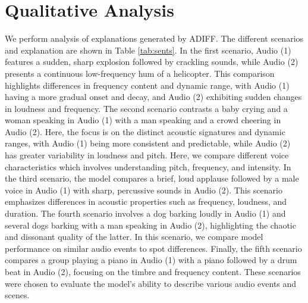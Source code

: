 \section{Qualitative Analysis} \vspace{-0.1in}
We perform analysis of explanations generated by ADIFF. The different scenarios and explanation are shown in Table \ref{tab:sents}. In the first scenario, Audio (1) features a sudden, sharp explosion followed by crackling sounds, while Audio (2) presents a continuous low-frequency hum of a helicopter. This comparison highlights differences in frequency content and dynamic range, with Audio (1) having a more gradual onset and decay, and Audio (2) exhibiting sudden changes in loudness and frequency. The second scenario contrasts a baby crying and a woman speaking in Audio (1) with a man speaking and a crowd cheering in Audio (2). Here, the focus is on the distinct acoustic signatures and dynamic ranges, with Audio (1) being more consistent and predictable, while Audio (2) has greater variability in loudness and pitch. Here, we compare different voice characteristics which involves understanding pitch, frequency, and intensity. In the third scenario, the model compares a brief, loud applause followed by a male voice in Audio (1) with sharp, percussive sounds in Audio (2). This scenario emphasizes differences in acoustic properties such as frequency, loudness, and duration. The fourth scenario involves a dog barking loudly in Audio (1) and several dogs barking with a man speaking in Audio (2), highlighting the chaotic and dissonant quality of the latter. In this scenario, we compare model performance on similar audio events to spot differences. Finally, the fifth scenario compares a group playing a piano in Audio (1) with a piano followed by a drum beat in Audio (2), focusing on the timbre and frequency content. These scenarios were chosen to evaluate the model's ability to describe various audio events and scenes. 

